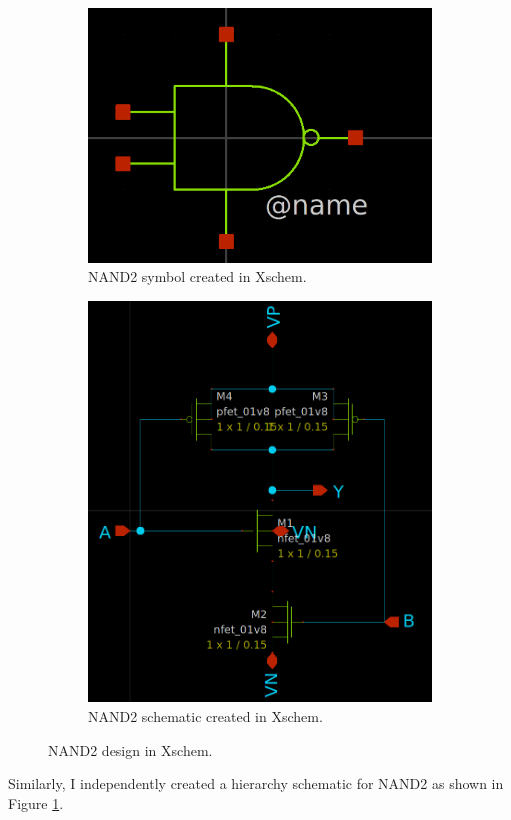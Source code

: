 \documentclass[11pt]{article}
\begin{document}
    \begin{figure}[!ht]
        \begin{subfigure}{0.5\linewidth}
            \includegraphics[width=\linewidth]{NAND2_sym.png}
            \caption{NAND2 symbol created in Xschem.}
        \end{subfigure}
        \begin{subfigure}{0.5\linewidth}
            \includegraphics[width=\linewidth]{NAND2_sch.png}
            \caption{NAND2 schematic created in Xschem.}
        \end{subfigure}
        \caption{NAND2 design in Xschem.}
        \label{fig:nand2}
    \end{figure}
    Similarly, I independently created a hierarchy schematic for NAND2 as shown in Figure \ref{fig:nand2}.
\end{document}
